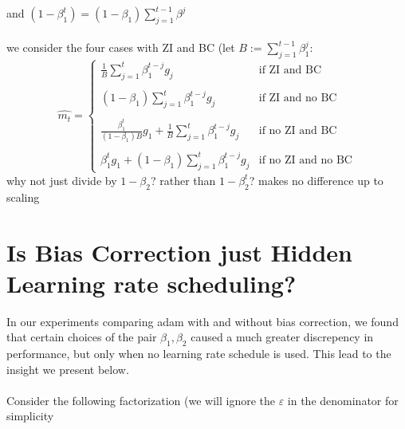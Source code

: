 \documentclass[12pt]{book}
\begin{document}
and $(1 - \beta_1^{t}) = (1-\beta_1)\sum_{j=1}^{t-1} {\beta^{j}}$ \\
\\
we consider the four cases with ZI and BC (let $B := \sum_{j=1}^{t-1} {\beta_1^{j}}$:
\[
	\hat{m_t} = \begin{cases}
		\frac{1}{B}\sum_{j=1}^{t} {\beta_1^{t-j}g_j} \quad &\text{if ZI and BC}\\
		\\
	       (1-\beta_1)\sum_{j=1}^{t} {\beta_1^{t-j}g_j}  &\text{if ZI and no BC}\\
	       \\
             \frac{\beta_1^{t}}{(1-\beta_1)B}g_1 +  \frac{1}{B}\sum_{j=1}^{t} {\beta_1^{t-j}g_j}  						     &\text{if no ZI and BC}\\
	     \\
	\beta_1^{t}g_1 + (1-\beta_1)\sum_{j=1}^{t} {\beta_1^{t-j}g_j}   						     & \text{if no ZI and no BC}

\end{cases}
\] 
why not just divide by $1-\beta_2$? rather than $1-\beta_2^{t}$? makes no difference up to scaling



\section{Is Bias Correction just Hidden Learning rate scheduling?}
In our experiments comparing adam with and without bias correction, we found that certain choices of the pair $\beta_1, \beta_2$ caused a much greater discrepency in performance, but only when no learning rate schedule is used. This lead to the insight we present below. \\
\\
Consider the following factorization (we will ignore the $\varepsilon $ in the denominator for simplicity
\footnotemark{}
\end{document}

